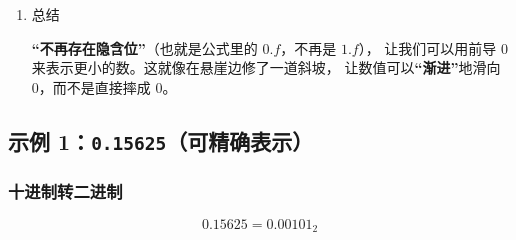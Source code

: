 \begin{enumerate}[label=\ding{\numexpr171+\arabic*}]
\subsubsection*{情况 B：有渐进下溢（你图片中的情况）}
\begin{itemize}
    \item 最小的正常数依然是 $1.0 \times 10^{-1} (= 0.10)$。
    \item 但是，当小于 0.10 时，我们要启用\textbf{非规范化模式}（不再强求 1.x 开头，变成 0.x 开头，且指数固定）。
    \item 我们可以表示 $0.9 \times 10^{-1} (= 0.09)$。
    \item 我们可以表示 $0.1 \times 10^{-1} (= 0.01)$。
    \item \textbf{路径：} $0.10 \to 0.09 \to \dots \to 0.01 \to 0.00$。
    \item \textit{好处：在 0 附近虽然精度降低了（有效数字变少了），但至少数值是连续的，不会突然消失。}
\end{itemize}

\item  总结

    \textbf{“不再存在隐含位”}（也就是公式里的 $0.f$，不再是 $1.f$），
    让我们可以用前导 0 来表示更小的数。这就像在悬崖边修了一道斜坡，
    让数值可以\textbf{“渐进”}地滑向 0，而不是直接摔成 0。

\end{enumerate}


\newpage







































\subsection{示例 1：\texttt{0.15625}（可精确表示）}

\subsubsection*{十进制转二进制}
\[
0.15625 = 0.00101_2
\]

